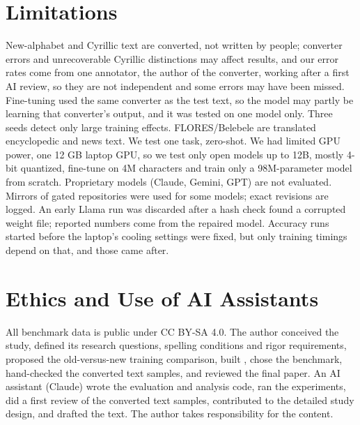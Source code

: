 \section*{Limitations}
New-alphabet and Cyrillic text are converted, not written by people; converter errors and unrecoverable Cyrillic distinctions may affect results, and our error rates come from one annotator, the author of the converter, working after a first AI review, so they are not independent and some errors may have been missed. Fine-tuning used the same converter as the test text, so the model may partly be learning that converter's output, and it was tested on one model only. Three seeds detect only large training effects. FLORES/Belebele are translated encyclopedic and news text. We test one task, zero-shot. We had limited GPU power, one 12 GB laptop GPU, so we test only open models up to 12B, mostly 4-bit quantized, fine-tune on 4M characters and train only a 98M-parameter model from scratch. Proprietary models (Claude, Gemini, GPT) are not evaluated. Mirrors of gated repositories were used for some models; exact revisions are logged. An early Llama run was discarded after a hash check found a corrupted weight file; reported numbers come from the repaired model. Accuracy runs started before the laptop's cooling settings were fixed, but only training timings depend on that, and those came after.

\section*{Ethics and Use of AI Assistants}
All benchmark data is public under CC BY-SA 4.0. The author conceived the study, defined its research questions, spelling conditions and rigor requirements, proposed the old-versus-new training comparison, built \convbuilt, chose the benchmark, hand-checked the converted text samples, and reviewed the final paper. An AI assistant (Claude) wrote the evaluation and analysis code, ran the experiments, did a first review of the converted text samples, contributed to the detailed study design, and drafted the text. The author takes responsibility for the content.


